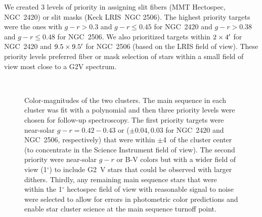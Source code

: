 \documentclass{aastex6}
\newcommand{\degree}{^\circ}
\begin{document}
We created 3 levels of priority in assigning slit fibers (MMT Hectospec, NGC~2420) or slit masks (Keck LRIS~NGC 2506).
The highest priority targets were the ones with $g-r > 0.3$ and $g-r \le0.45$ for NGC~2420 and $g-r > 0.38$ and $g-r \le 0.48$ for NGC~2506.
We also prioritized targets within  $2 \times 4\mbox{$^\prime$} $ for NGC~2420 and $9.5 \times 9.5\mbox{$^\prime$} $ for NGC~2506 (based on the LRIS field of view).
These priority levels preferred fiber or mask selection of stars within a small field of view most close to a G2V spectrum.

\begin{figure}[!t]
\centering
{}
\\
	\caption{Color-magnitudes of the two clusters.
	The main sequence in each cluster was fit with a polynomial and then three priority levels were chosen for follow-up spectroscopy.
	The first priority targets were near-solar $g-r = 0.42-0.43$ or ($\pm 0.04, 0.03$ for NGC~2420 and NGC~2506, respectively) that were within $\pm$4\arcmin\ of the cluster center (to concentrate in the Science Instrument field of view).
	The second priority were near-solar $g-r$ or B-V colors but with a wider field of view (1$\degree$) to include G2~V stars that could be observed with larger dithers.
	Thirdly, any remaining main sequence stars that were within the 1$\degree$ hectospec field of view with reasonable signal to noise were selected to allow for errors in photometric color predictions and enable star cluster science at the main sequence turnoff point.}
	\label{fig:cmdPS}
\end{figure} 
\end{document}
